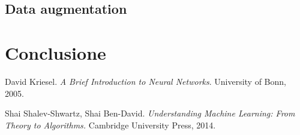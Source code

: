 \documentclass[12pt, twoside, letterpaper]{report}
\begin{document}
		\section{Data augmentation}

	\chapter*{Conclusione}	
	
	\begin{thebibliography}{9}
		 David Kriesel. \textit{A Brief Introduction to Neural Networks}. University of Bonn, 2005.

		 Shai Shalev-Shwartz, Shai Ben-David. \textit{Understanding Machine Learning: From Theory to Algorithms.} Cambridge University Press, 2014.

	\end{thebibliography}
	
\end{document}
